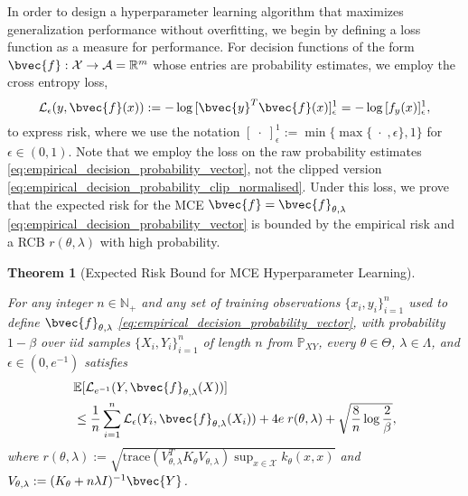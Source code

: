 \documentclass[twoside]{article}
\newtheorem{theorem}{Theorem}[section]
\begin{document}
		In order to design a hyperparameter learning algorithm that maximizes generalization performance without overfitting, we begin by defining a loss function as a measure for performance. For decision functions of the form $\bvec{f} : \mathcal{X} \to \mathcal{A} = \mathbb{R}^{m}$ whose entries are probability estimates, we employ the cross entropy loss,
		\begin{equation}
		\mathcal{L}_{\epsilon}(y, \bvec{f}(x)) := - \log{ [\bvec{y}^{T} \bvec{f}(x)]_{\epsilon}^{1} } = - \log{ [f_{y}(x)]_{\epsilon}^{1} },
		\label{eq:cross_entropy_loss_copy}
		\end{equation}
		to express risk, where we use the notation $[\;\cdot\;]_{\epsilon}^{1} := \min\{\max\{\;\cdot\;, \epsilon\}, 1\}$ for $\epsilon \in (0, 1)$. Note that we employ the loss on the raw probability estimates \eqref{eq:empirical_decision_probability_vector}, not the clipped version \eqref{eq:empirical_decision_probability_clip_normalised}. Under this loss, we prove that the expected risk for the \gls{MCE} $\bvec{f} = \bvec{f}_{\theta, \lambda}$ \eqref{eq:empirical_decision_probability_vector} is bounded by the empirical risk and a \gls{RCB} $r(\theta, \lambda)$ with high probability.
		
		\begin{theorem}[Expected Risk Bound for \gls{MCE} Hyperparameter Learning]
			\label{thm:expected_risk_bound_hyperparameter_learning_copy}
			
			For any integer $n \in \mathbb{N}_{+}$ and any set of training observations $\{x_{i}, y_{i}\}_{i = 1}^{n}$ used to define $\bvec{f}_{\theta, \lambda}$ \eqref{eq:empirical_decision_probability_vector}, with probability $1 - \beta$ over \textit{iid} samples $\{X_{i}, Y_{i}\}_{i = 1}^{n}$ of length $n$ from $\mathbb{P}_{X Y}$, every $\theta \in \Theta$, $\lambda \in \Lambda$, and $\epsilon \in (0, e^{-1})$ satisfies
			\begin{equation}
			\begin{aligned}
			&\mathbb{E}[\mathcal{L}_{e^{-1}}(Y, \bvec{f}_{\theta, \lambda}(X))] \\
			&\leq \frac{1}{n} \sum_{i = 1}^{n} \mathcal{L}_{\epsilon}(Y_{i}, \bvec{f}_{\theta, \lambda}(X_{i})) + 4 e \; r(\theta, \lambda) + \sqrt{\frac{8}{n} \log{\frac{2}{\beta}}},
			\label{eq:expected_risk_bound_hyperparameter_learning_copy}
			\end{aligned}
			\end{equation}
			where $r(\theta, \lambda) := \sqrt{\mathrm{trace}(V_{\theta, \lambda}^{T} K_{\theta} V_{\theta, \lambda}) \sup_{x \in \mathcal{X}} k_{\theta}(x, x)}$ and $V_{\theta, \lambda} := (K_{\theta} + n \lambda I)^{-1} \bvec{Y}$.
		\end{theorem}
		
\end{document}
